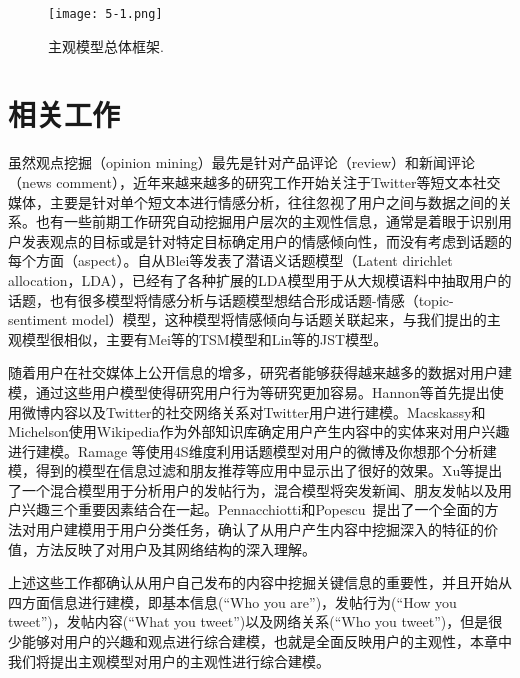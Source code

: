 \begin{landscape}
\begin{figure*}[htb]
\centering
\texttt{[image: 5-1.png]}
\caption{主观模型总体框架.}
\label{fig5-1}
\end{figure*}

\section{相关工作}
\label{ch5_sec2}
虽然观点挖掘（opinion mining）最先是针对产品评论（review）和新闻评论（news comment），近年来越来越多的研究工作开始关注于Twitter等短文本社交媒体，主要是针对单个短文本进行情感分析，往往忽视了用户之间与数据之间的关系。也有一些前期工作研究自动挖掘用户层次的主观性信息，通常是着眼于识别用户发表观点的目标或是针对特定目标确定用户的情感倾向性，而没有考虑到话题的每个方面（aspect）。自从Blei等发表了潜语义话题模型（Latent dirichlet allocation，LDA），已经有了各种扩展的LDA模型用于从大规模语料中抽取用户的话题，也有很多模型将情感分析与话题模型想结合形成话题-情感（topic-sentiment model）模型，这种模型将情感倾向与话题关联起来，与我们提出的主观模型很相似，主要有Mei等的TSM模型和Lin等的JST模型。

随着用户在社交媒体上公开信息的增多，研究者能够获得越来越多的数据对用户建模，通过这些用户模型使得研究用户行为等研究更加容易。Hannon等首先提出使用微博内容以及Twitter的社交网络关系对Twitter用户进行建模。Macskassy和Michelson使用Wikipedia作为外部知识库确定用户产生内容中的实体来对用户兴趣进行建模。Ramage 等使用4S维度利用话题模型对用户的微博及你想那个分析建模，得到的模型在信息过滤和朋友推荐等应用中显示出了很好的效果。Xu等提出了一个混合模型用于分析用户的发帖行为，混合模型将突发新闻、朋友发帖以及用户兴趣三个重要因素结合在一起。Pennacchiotti和Popescu~提出了一个全面的方法对用户建模用于用户分类任务，确认了从用户产生内容中挖掘深入的特征的价值，方法反映了对用户及其网络结构的深入理解。

上述这些工作都确认从用户自己发布的内容中挖掘关键信息的重要性，并且开始从四方面信息进行建模，即基本信息(“Who you are”)，发帖行为(“How
you tweet”)，发帖内容(“What you tweet”)以及网络关系(“Who you tweet”)，但是很少能够对用户的兴趣和观点进行综合建模，也就是全面反映用户的主观性，本章中我们将提出主观模型对用户的主观性进行综合建模。


\end{landscape}
